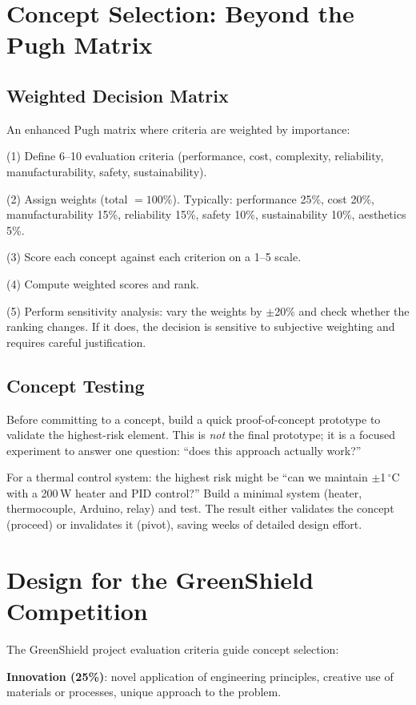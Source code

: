 \documentclass[11pt,letterpaper,twoside,openany]{book}
\newcommand{\degC}{\ensuremath{{}^{\circ}\text{C}}}
\begin{document}
\section{Concept Selection: Beyond the Pugh Matrix}
\subsection{Weighted Decision Matrix}
An enhanced Pugh matrix where criteria are weighted by importance:

(1) Define 6--10 evaluation criteria (performance, cost, complexity, reliability, manufacturability, safety, sustainability).

(2) Assign weights (total $= 100\%$). Typically: performance 25\%, cost 20\%, manufacturability 15\%, reliability 15\%, safety 10\%, sustainability 10\%, aesthetics 5\%.

(3) Score each concept against each criterion on a 1--5 scale.

(4) Compute weighted scores and rank.

(5) Perform sensitivity analysis: vary the weights by $\pm$20\% and check whether the ranking changes. If it does, the decision is sensitive to subjective weighting and requires careful justification.

\subsection{Concept Testing}
Before committing to a concept, build a quick proof-of-concept prototype to validate the highest-risk element. This is \emph{not} the final prototype; it is a focused experiment to answer one question: ``does this approach actually work?''

For a thermal control system: the highest risk might be ``can we maintain $\pm$1\,\degC{} with a 200\,W heater and PID control?'' Build a minimal system (heater, thermocouple, Arduino, relay) and test. The result either validates the concept (proceed) or invalidates it (pivot), saving weeks of detailed design effort.

\section{Design for the GreenShield Competition}
The GreenShield project evaluation criteria guide concept selection:

\textbf{Innovation (25\%)}: novel application of engineering principles, creative use of materials or processes, unique approach to the problem.
\end{document}
